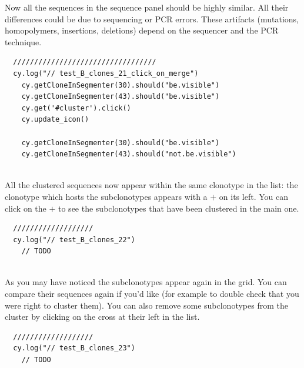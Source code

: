 Now all the sequences in the sequence panel should be highly similar. All their
differences could be due to sequencing or PCR errors.
These artifacts (mutations, homopolymers, insertions, deletions)
depend on the sequencer and the PCR technique.

\begin{verbatim}
  //////////////////////////////////
  cy.log("// test_B_clones_21_click_on_merge")
    cy.getCloneInSegmenter(30).should("be.visible")
    cy.getCloneInSegmenter(43).should("be.visible")
    cy.get('#cluster').click()
    cy.update_icon()

    cy.getCloneInSegmenter(30).should("be.visible")
    cy.getCloneInSegmenter(43).should("not.be.visible")


\end{verbatim}

All the clustered sequences now appear within the same clonotype in the list: the clonotype which hosts the subclonotypes appears with a $+$ on its
left. You can click on the $+$ to see the subclonotypes that have been clustered in
the main one.
\begin{verbatim}
  ///////////////////
  cy.log("// test_B_clones_22")
    // TODO


\end{verbatim}

As you may have noticed the subclonotypes appear again in the grid. You can
compare their sequences again if you'd like (for example to double check that
you were right to cluster them). You can also remove some subclonotypes from the
cluster by clicking on the cross at their left in the list.
\begin{verbatim}
  ///////////////////
  cy.log("// test_B_clones_23")
    // TODO


\end{verbatim}

